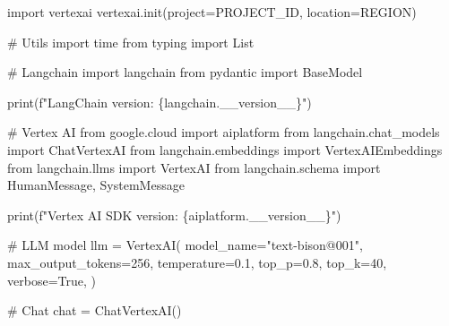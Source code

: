 \documentclass[
  letterpaper,
  DIV=11,
  numbers=noendperiod]{scrreprt}
\newenvironment{Shaded}{\begin{snugshade}}{\end{snugshade}}
\newcommand{\BuiltInTok}[1]{\textcolor[rgb]{0.00,0.23,0.31}{#1}}
\newcommand{\CommentTok}[1]{\textcolor[rgb]{0.37,0.37,0.37}{#1}}
\newcommand{\DecValTok}[1]{\textcolor[rgb]{0.68,0.00,0.00}{#1}}
\newcommand{\FloatTok}[1]{\textcolor[rgb]{0.68,0.00,0.00}{#1}}
\newcommand{\ImportTok}[1]{\textcolor[rgb]{0.00,0.46,0.62}{#1}}
\newcommand{\NormalTok}[1]{\textcolor[rgb]{0.00,0.23,0.31}{#1}}
\newcommand{\OperatorTok}[1]{\textcolor[rgb]{0.37,0.37,0.37}{#1}}
\newcommand{\SpecialCharTok}[1]{\textcolor[rgb]{0.37,0.37,0.37}{#1}}
\newcommand{\SpecialStringTok}[1]{\textcolor[rgb]{0.13,0.47,0.30}{#1}}
\newcommand{\StringTok}[1]{\textcolor[rgb]{0.13,0.47,0.30}{#1}}
\newcommand{\VariableTok}[1]{\textcolor[rgb]{0.07,0.07,0.07}{#1}}
\begin{document}
\begin{Shaded}
\begin{Highlighting}[]
\ImportTok{import}\NormalTok{ vertexai}
\NormalTok{vertexai.init(project}\OperatorTok{=}\NormalTok{PROJECT\_ID, location}\OperatorTok{=}\NormalTok{REGION)}
\end{Highlighting}
\end{Shaded}

\begin{Shaded}
\begin{Highlighting}[]
\CommentTok{\# Utils}
\ImportTok{import}\NormalTok{ time}
\ImportTok{from}\NormalTok{ typing }\ImportTok{import}\NormalTok{ List}

\CommentTok{\# Langchain}
\ImportTok{import}\NormalTok{ langchain}
\ImportTok{from}\NormalTok{ pydantic }\ImportTok{import}\NormalTok{ BaseModel}

\BuiltInTok{print}\NormalTok{(}\SpecialStringTok{f"LangChain version: }\SpecialCharTok{\{}\NormalTok{langchain}\SpecialCharTok{.}\NormalTok{\_\_version\_\_}\SpecialCharTok{\}}\SpecialStringTok{"}\NormalTok{)}

\CommentTok{\# Vertex AI}
\ImportTok{from}\NormalTok{ google.cloud }\ImportTok{import}\NormalTok{ aiplatform}
\ImportTok{from}\NormalTok{ langchain.chat\_models }\ImportTok{import}\NormalTok{ ChatVertexAI}
\ImportTok{from}\NormalTok{ langchain.embeddings }\ImportTok{import}\NormalTok{ VertexAIEmbeddings}
\ImportTok{from}\NormalTok{ langchain.llms }\ImportTok{import}\NormalTok{ VertexAI}
\ImportTok{from}\NormalTok{ langchain.schema }\ImportTok{import}\NormalTok{ HumanMessage, SystemMessage}

\BuiltInTok{print}\NormalTok{(}\SpecialStringTok{f"Vertex AI SDK version: }\SpecialCharTok{\{}\NormalTok{aiplatform}\SpecialCharTok{.}\NormalTok{\_\_version\_\_}\SpecialCharTok{\}}\SpecialStringTok{"}\NormalTok{)}
\end{Highlighting}
\end{Shaded}

\begin{Shaded}
\begin{Highlighting}[]
\CommentTok{\# LLM model}
\NormalTok{llm }\OperatorTok{=}\NormalTok{ VertexAI(}
\NormalTok{    model\_name}\OperatorTok{=}\StringTok{"text{-}bison@001"}\NormalTok{,}
\NormalTok{    max\_output\_tokens}\OperatorTok{=}\DecValTok{256}\NormalTok{,}
\NormalTok{    temperature}\OperatorTok{=}\FloatTok{0.1}\NormalTok{,}
\NormalTok{    top\_p}\OperatorTok{=}\FloatTok{0.8}\NormalTok{,}
\NormalTok{    top\_k}\OperatorTok{=}\DecValTok{40}\NormalTok{,}
\NormalTok{    verbose}\OperatorTok{=}\VariableTok{True}\NormalTok{,}
\NormalTok{)}

\CommentTok{\# Chat}
\NormalTok{chat }\OperatorTok{=}\NormalTok{ ChatVertexAI()}
\end{Highlighting}
\end{Shaded}
\end{document}
